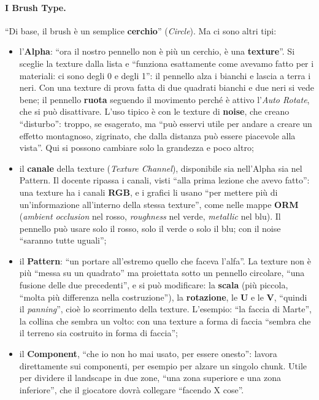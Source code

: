 \paragraph{I Brush Type.} ``Di base, il brush è un semplice \textbf{cerchio}''
(\emph{Circle}). Ma ci sono altri tipi:
\begin{itemize}
  \item l'\textbf{Alpha}: ``ora il nostro pennello non è più un cerchio, è una
        \textbf{texture}''. Si sceglie la texture dalla lista e ``funziona esattamente come
        avevamo fatto per i materiali: ci sono degli 0 e degli 1'': il pennello alza i bianchi
        e lascia a terra i neri. Con una texture di prova fatta di due quadrati bianchi e due
        neri si vede bene; il pennello \textbf{ruota} seguendo il movimento perché è attivo
        l'\emph{Auto Rotate}, che si può disattivare. L'uso tipico è con le texture di
        \textbf{noise}, che creano ``disturbo'': troppo, se esagerato, ma ``può esservi utile
        per andare a creare un effetto montagnoso, zigrinato, che dalla distanza può essere
        piacevole alla vista''. Qui si possono cambiare solo la grandezza e poco altro;
  \item il \textbf{canale} della texture (\emph{Texture Channel}), disponibile sia nell'Alpha
        sia nel Pattern. Il docente ripassa i canali, visti ``alla prima lezione che avevo
        fatto'': una texture ha i canali \textbf{RGB}, e i grafici li usano ``per mettere più di
        un'informazione all'interno della stessa texture'', come nelle mappe \textbf{ORM}
        (\emph{ambient occlusion} nel rosso, \emph{roughness} nel verde, \emph{metallic} nel
        blu). Il pennello può usare solo il rosso, solo il verde o solo il blu; con il noise
        ``saranno tutte uguali'';
  \item il \textbf{Pattern}: ``un portare all'estremo quello che faceva l'alfa''. La texture
        non è più ``messa su un quadrato'' ma proiettata sotto un pennello circolare, ``una
        fusione delle due precedenti'', e si può modificare: la \textbf{scala} (più piccola,
        ``molta più differenza nella costruzione''), la \textbf{rotazione}, le \textbf{U} e le
        \textbf{V}, ``quindi il \emph{panning}'', cioè lo scorrimento della texture.
        L'esempio: ``la faccia di Marte'', la collina che sembra un volto: con una texture a
        forma di faccia ``sembra che il terreno sia costruito in forma di faccia'';
  \item il \textbf{Component}, ``che io non ho mai usato, per essere onesto'': lavora
        direttamente sui componenti, per esempio per alzare un singolo chunk. Utile per
        dividere il landscape in due zone, ``una zona superiore e una zona inferiore'', che il
        giocatore dovrà collegare ``facendo X cose''.
\end{itemize}

